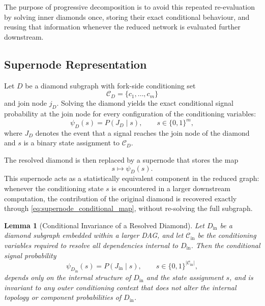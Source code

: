 \documentclass[preprint,12pt]{elsarticle}
\newtheorem{lemma}{Lemma}[section]
\begin{document}
The purpose of progressive decomposition is to avoid this repeated re-evaluation by solving inner diamonds once, storing their exact conditional behaviour, and reusing that information whenever the reduced network is evaluated further downstream.

\subsection{Supernode Representation}

Let $D$ be a diamond subgraph with fork-side conditioning set
\[
\mathcal{C}_D = \{c_1,\ldots,c_m\}
\]
and join node $j_D$. Solving the diamond yields the exact conditional signal probability at the join node for every configuration of the conditioning variables:
\begin{equation}
\psi_D(s) = P(J_D \mid s),
\qquad s \in \{0,1\}^{m},
\label{eq:supernode_conditional_map}
\end{equation}
where $J_D$ denotes the event that a signal reaches the join node of the diamond and $s$ is a binary state assignment to $\mathcal{C}_D$.

The resolved diamond is then replaced by a supernode that stores the map
\[
s \mapsto \psi_D(s).
\]
This supernode acts as a statistically equivalent component in the reduced graph: whenever the conditioning state $s$ is encountered in a larger downstream computation, the contribution of the original diamond is recovered exactly through \eqref{eq:supernode_conditional_map}, without re-solving the full subgraph.


\begin{lemma}[Conditional Invariance of a Resolved Diamond]
Let $D_{\mathrm{in}}$ be a diamond subgraph embedded within a larger DAG, and let $\mathcal{C}_{\mathrm{in}}$ be the conditioning variables required to resolve all dependencies internal to $D_{\mathrm{in}}$. Then the conditional signal probability
\begin{equation}
    \psi_{D_{\mathrm{in}}}(s) = P(J_{\mathrm{in}} \mid s),
\qquad s \in \{0,1\}^{|\mathcal{C}_{\mathrm{in}}|},
\end{equation}
depends only on the internal structure of $D_{\mathrm{in}}$ and the state assignment $s$, and is invariant to any outer conditioning context that does not alter the internal topology or component probabilities of $D_{\mathrm{in}}$.
\end{lemma}
\end{document}
